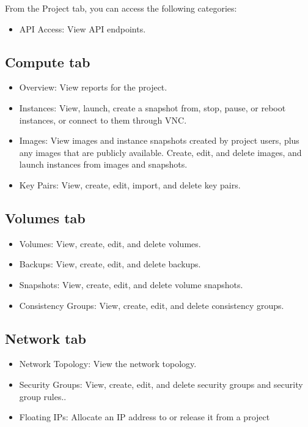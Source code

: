 From the Project tab, you can access the following categories:
\begin{itemize}
\item
  API Access: View API endpoints.
\end{itemize}

\subsection*{\texorpdfstring{Compute
tab}{Compute tab}}\label{compute-tab}

\begin{itemize}
\item
  Overview: View reports for the project.
\item
  Instances: View, launch, create a snapshot from, stop, pause, or
  reboot instances, or connect to them through VNC.
\item
  Images: View images and instance snapshots created by project users,
  plus any images that are publicly available. Create, edit, and delete
  images, and launch instances from images and snapshots.
\item
  Key Pairs: View, create, edit, import, and delete key pairs.
\end{itemize}

\subsection*{\texorpdfstring{Volumes
tab}{Volumes tab}}\label{volumes-tab}

\begin{itemize}
\item
  Volumes: View, create, edit, and delete volumes.
\item
  Backups: View, create, edit, and delete backups.
\item
  Snapshots: View, create, edit, and delete volume snapshots.
\item
  Consistency Groups: View, create, edit, and delete consistency groups.
\end{itemize}

\subsection*{\texorpdfstring{Network
tab}{Network tab}}\label{network-tab}

\begin{itemize}
\item
  Network Topology: View the network topology.
\item
  Security Groups: View, create, edit, and delete security groups and
  security group rules..
\item
  Floating IPs: Allocate an IP address to or release it from a project
\end{itemize}

